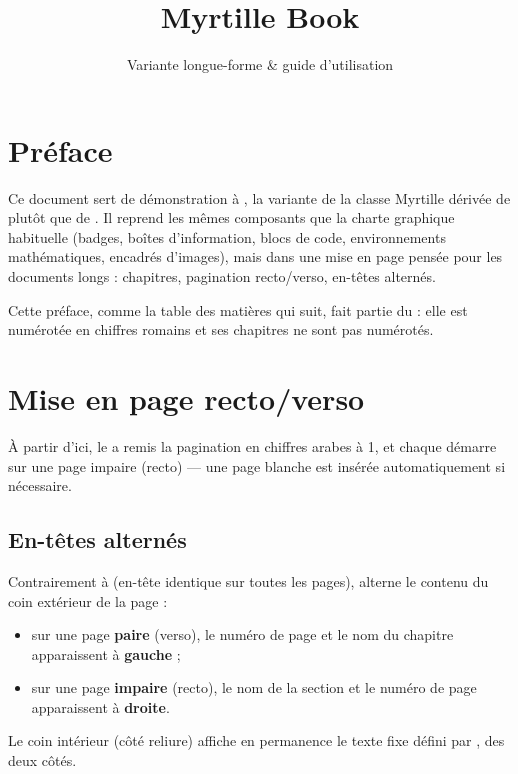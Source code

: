 \documentclass[theme=pringlea]{myrtillebook}
\title{Myrtille Book}
\subtitle{Variante longue-forme \& guide d'utilisation}
\begin{document}
\makecover

\frontmatter

\chapter*{Préface}
Ce document sert de démonstration à , la variante de la classe Myrtille dérivée de  plutôt que de . Il reprend les mêmes composants que la charte graphique habituelle (badges, boîtes d'information, blocs de code, environnements mathématiques, encadrés d'images), mais dans une mise en page pensée pour les documents longs : chapitres, pagination recto/verso, en-têtes alternés.

Cette préface, comme la table des matières qui suit, fait partie du  : elle est numérotée en chiffres romains et ses chapitres ne sont pas numérotés.

\renewcommand{\contentsname}{Table des matières}
\tableofcontents

\mainmatter

\chapter{Mise en page recto/verso}

À partir d'ici, le  a remis la pagination en chiffres arabes à 1, et chaque  démarre sur une page impaire (recto) — une page blanche est insérée automatiquement si nécessaire.

\section{En-têtes alternés}
Contrairement à  (en-tête identique sur toutes les pages),  alterne le contenu du coin extérieur de la page :
\begin{itemize}
  \item sur une page \textbf{paire} (verso), le numéro de page et le nom du chapitre apparaissent à \textbf{gauche} ;
  \item sur une page \textbf{impaire} (recto), le nom de la section et le numéro de page apparaissent à \textbf{droite}.
\end{itemize}
Le coin intérieur (côté reliure) affiche en permanence le texte fixe défini par , des deux côtés.
\end{document}
